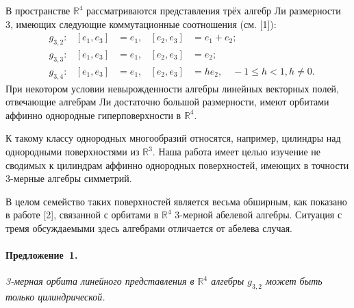 
\vzmscaption


В пространстве $\mathbb{R}^4 $ рассматриваются представления трёх алгебр Ли размерности 3, имеющих следующие
коммутационные соотношения (см. [1]):
\begin{align*}
	&g_{3,2} : & [e_1,e_3] &= e_1, & [e_2,e_3] &= e_1 + e_2;\\
	&g_{3,3} : & [e_1,e_3] &= e_1, & [e_2,e_3] &= e_2;\\
    &g_{3,4} : & [e_1,e_3] &= e_1, & [e_2,e_3] &=  h e_2, \quad -1 \leqslant h < 1, h \neq 0.
\end{align*}
При некотором условии невырожденности алгебры линейных векторных полей, отвечающие алгебрам Ли достаточно большой размерности, имеют орбитами аффинно однородные гиперповерхности в $\mathbb{R}^4$.

К такому классу однородных многообразий относятся, например, цилиндры над однородными поверхностями из $\mathbb{R}^3$.
Наша работа имеет целью изучение не сводимых к цилиндрам аффинно однородных поверхностей, имеющих в точности 3-мерные алгебры симметрий.

В целом семейство таких поверхностей является весьма обширным, как показано в работе [2], связанной с орбитами в $\mathbb{R}^4$ 3-мерной абелевой алгебры. Ситуация с тремя обсуждаемыми здесь алгебрами отличается от абелева случая.

\paragraph{Предложение~1.}
{\it
3-мерная орбита линейного представления в $\mathbb{R}^4$ алгебры $g_{3,2}$ может быть только цилиндрической.
}

